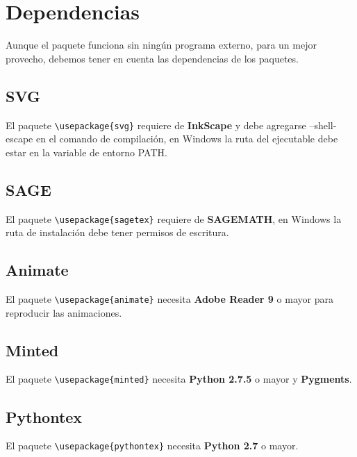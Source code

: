 \chapter{Dependencias}\label{cap:dependencias}
{\justifying
	Aunque el paquete \printproject\space funciona sin ningún programa externo, para un mejor provecho, debemos tener en cuenta las dependencias de los paquetes.
	\section{SVG}\label{sec:DependenciasSVG}
	El paquete \verb|\usepackage{svg}| requiere de \textbf{InkScape} y debe agregarse --shell-escape en el comando de compilación, en Windows la ruta del ejecutable debe estar en la variable de entorno PATH. 
	\section{SAGE}
	El paquete \verb|\usepackage{sagetex}| requiere de \textbf{SAGEMATH}, en Windows la ruta de instalación debe tener permisos de escritura.
	\section{Animate}
	El paquete \verb|\usepackage{animate}| necesita \textbf{Adobe Reader 9} o mayor para reproducir las animaciones.
	\section{Minted}
	El paquete \verb|\usepackage{minted}| necesita \textbf{Python 2.7.5} o mayor y \textbf{Pygments}.
	\section{Pythontex}
	El paquete \verb|\usepackage{pythontex}| necesita \textbf{Python 2.7} o mayor. 
}
